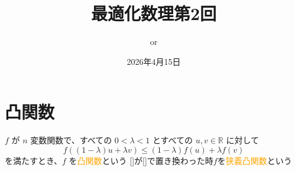 \documentclass{ltjsarticle}
\title{最適化数理第2回}
\author{or}
\date{2026年4月15日}
\begin{document}
\maketitle

\section{凸関数}
$f$ が $n$ 変数関数で、すべての $0 < \lambda < 1$ とすべての $u, v \in \mathbb{R}$ に対して
\[
f((1-\lambda)u + \lambda v) \le (1-\lambda)f(u) + \lambda f(v)
\]
を満たすとき、$f$ を\textcolor{orange}{凸関数}という
[\leqq]が[\le]で置き換わった時$f$を\textcolor{orange}{狭義凸関数}という
\end{document}
